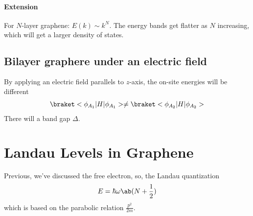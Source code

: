 \paragraph{Extension}

For $N$-layer graphene: $E(k) \sim k^N$.
The energy bands get flatter as $N$ increasing, which will get a larger density
of states.

\subsection{Bilayer graphere under an electric field}

By applying an electric field parallels to $z$-axis,
the on-site energies will be different
\[
  \braket<\phi_{A_1}|H|\phi_{A_1}> \neq
  \braket<\phi_{A_2}|H|\phi_{A_2}>
\]
There will a band gap $\Delta$.

\section{Landau Levels in Graphene}

Previous, we've discussed the free electron, so, the Landau
quantization
\[
  E = \hbar\omega\ab(N + \frac12)
\]
which is based on the parabolic relation $\frac{p^2}{2m}$.

